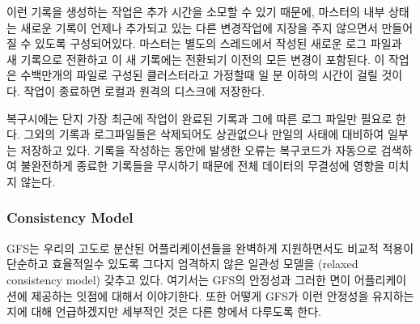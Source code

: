 \documentclass[twocolumn]{article}
\begin{document}
  이런 기록을 생성하는 작업은 추가 시간을 소모할 수 있기 때문에, 마스터의 내부 상태는 새로운 기록이 언제나 추가되고 있는 다른 변경작업에 지장을 주지 않으면서 만들어 질 수 있도록 구성되어있다.  마스터는 별도의 스레드에서 작성된 새로운 로그 파일과 새 기록으로 전환하고 이 새 기록에는 전환되기 이전의 모든 변경이 포함된다.  이 작업은 수백만개의 파일로 구성된 클러스터라고 가정할때 일 분 이하의 시간이 걸릴 것이다.  작업이 종료하면 로컬과 원격의 디스크에 저장한다.

 복구시에는 단지 가장 최근에 작업이 완료된 기록과 그에 따른 로그 파일만 필요로 한다.  그외의 기록과 로그파일들은 삭제되어도 상관없으나 만일의 사태에 대비하여 일부는 저장하고 있다.  기록을 작성하는 동안에 발생한 오류는 복구코드가 자동으로 검색하여 불완전하게 종료한 기록들을 무시하기 때문에 전체 데이터의 무결성에 영향을 미치지 않는다.

\subsubsection{Consistency Model}

 GFS는 우리의 고도로 분산된 어플리케이션들을 완벽하게 지원하면서도 비교적 적용이 단순하고 효율적일수 있도록 그다지 엄격하지 않은 일관성 모델을 (relaxed consistency model) 갖추고 있다.  여기서는 GFS의 안정성과 그러한 면이 어플리케이션에 제공하는 잇점에 대해서 이야기한다.  또한 어떻게 GFS가 이런 안정성을 유지하는지에 대해 언급하겠지만 세부적인 것은 다른 항에서 다루도록 한다.
\end{document}
